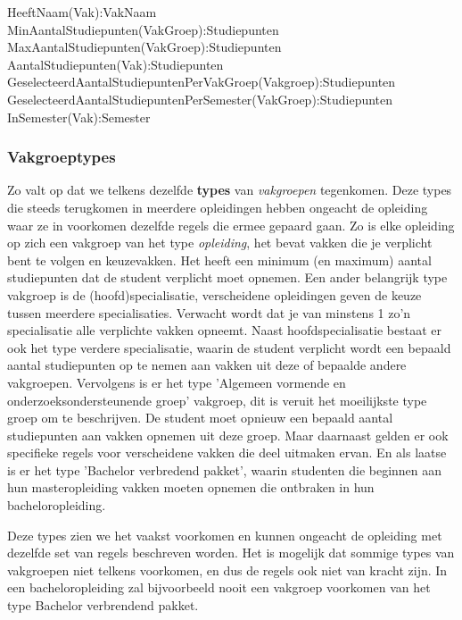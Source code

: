 \begin{description}
\item [HeeftNaam(Vak):VakNaam]
\item [MinAantalStudiepunten(VakGroep):Studiepunten]
\item [MaxAantalStudiepunten(VakGroep):Studiepunten]
\item [AantalStudiepunten(Vak):Studiepunten]
\item [GeselecteerdAantalStudiepuntenPerVakGroep(Vakgroep):Studiepunten]
\item [GeselecteerdAantalStudiepuntenPerSemester(VakGroep):Studiepunten]
\item [InSemester(Vak):Semester]
\end{description}

\subsubsection{Vakgroeptypes}
Zo valt op dat we telkens dezelfde \textbf{types} van \emph{vakgroepen} tegenkomen. Deze types die steeds terugkomen in meerdere opleidingen hebben ongeacht de opleiding waar ze in voorkomen dezelfde regels die ermee gepaard gaan. Zo is elke opleiding op zich een vakgroep van het type \emph{opleiding}, het bevat vakken die je verplicht bent te volgen en keuzevakken. Het heeft een minimum (en maximum) aantal studiepunten dat de student verplicht moet opnemen. Een ander belangrijk type vakgroep is de (hoofd)specialisatie, verscheidene opleidingen geven de keuze tussen meerdere specialisaties. Verwacht wordt dat je van minstens 1 zo'n specialisatie alle verplichte vakken opneemt. Naast hoofdspecialisatie bestaat er ook het type verdere specialisatie, waarin de student verplicht wordt een bepaald aantal studiepunten op te nemen aan vakken uit deze of bepaalde andere vakgroepen. Vervolgens is er het type 'Algemeen vormende en onderzoeksondersteunende groep' vakgroep, dit is veruit het moeilijkste type groep om te beschrijven. De student moet opnieuw een bepaald aantal studiepunten aan vakken opnemen uit deze groep. Maar daarnaast gelden er ook specifieke regels voor verscheidene vakken die deel uitmaken ervan. En als laatse is er het type 'Bachelor verbredend pakket', waarin studenten die beginnen aan hun masteropleiding vakken moeten opnemen die ontbraken in hun bacheloropleiding.

Deze types zien we het vaakst voorkomen en kunnen ongeacht de opleiding met dezelfde set van regels beschreven worden. Het is mogelijk dat sommige types van vakgroepen niet telkens voorkomen, en dus de regels ook niet van kracht zijn. In een bacheloropleiding zal bijvoorbeeld nooit een vakgroep voorkomen van het type Bachelor verbrendend pakket. 

